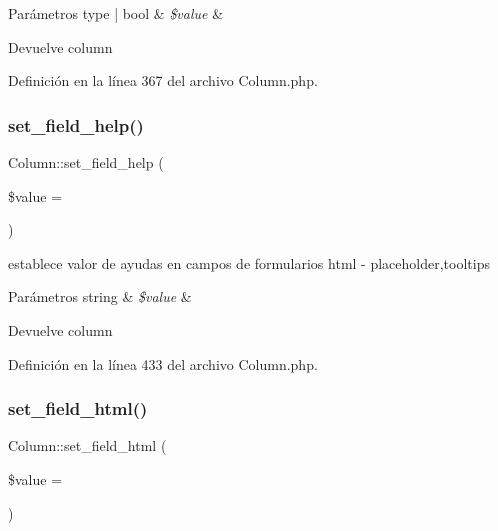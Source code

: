 \begin{DoxyParams}[1]{Parámetros}
type | bool & {\em \$value} & \\
\hline
\end{DoxyParams}
\begin{DoxyReturn}{Devuelve}
column 
\end{DoxyReturn}


Definición en la línea 367 del archivo Column.\+php.

\mbox{\label{class_column_ad21200d7ae8693427a38e51c100badf6}} 
\subsubsection{\texorpdfstring{set\_field\_help()}{set\_field\_help()}}
{\footnotesize\ttfamily Column\+::set\+\_\+field\+\_\+help (\begin{DoxyParamCaption}\item[{}]{\$value = {\ttfamily \textquotesingle{}\textquotesingle{}} }\end{DoxyParamCaption})}

establece valor de ayudas en campos de formularios html -\/ placeholder,tooltips


\begin{DoxyParams}[1]{Parámetros}
string & {\em \$value} & \\
\hline
\end{DoxyParams}
\begin{DoxyReturn}{Devuelve}
column 
\end{DoxyReturn}


Definición en la línea 433 del archivo Column.\+php.

\mbox{\label{class_column_a5437315051a5e96842582d3668554245}} 
\subsubsection{\texorpdfstring{set\_field\_html()}{set\_field\_html()}}
{\footnotesize\ttfamily Column\+::set\+\_\+field\+\_\+html (\begin{DoxyParamCaption}\item[{}]{\$value = {\ttfamily \textquotesingle{}\textquotesingle{}} }\end{DoxyParamCaption})}

